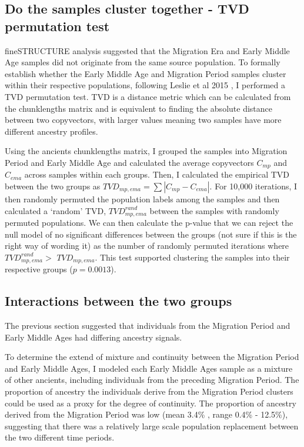 \subsection{Do the samples cluster together - TVD permutation test}

fineSTRUCTURE analysis suggested that the Migration Era and Early Middle Age samples did not originate from the same source population. To formally establish whether the Early Middle Age and Migration Period samples cluster within their respective populations, following Leslie et al 2015 \cite{Leslie2015}, I performed a TVD permutation test. TVD is a distance metric which can be calculated from the chunklengths matrix and is equivalent to finding the absolute distance between two copyvectors, with larger values meaning two samples have more different ancestry profiles.

Using the ancients chunklengths matrix, I grouped the samples into Migration Period and Early Middle Age and  calculated the average copyvectors $C_{mp}$ and $C_{ema}$ across samples within each groups. Then, I calculated the empirical TVD between the two groups as $TVD_{mp,ema} = \sum |C_{mp} - C_{ema}|$. For 10,000 iterations, I then randomly permuted the population labels among the samples and then calculated a `random' TVD, $TVD_{mp,ema}^{rand}$ between the samples with randomly permuted populations. We can then calculate the p-value that we can reject the null model of no significant differences between the groups (not sure if this is the right way of wording it) as the number of randomly permuted iterations where $TVD_{mp,ema}^{rand} > $ $TVD_{mp,ema}$. This test supported clustering the samples into their respective groups ($p=0.0013$).

\subsection{Interactions between the two groups}

The previous section suggested that individuals from the Migration Period and Early Middle Ages had differing ancestry signals. 

To determine the extend of mixture and continuity between the Migration Period and Early Middle Ages, I modeled each Early Middle Ages sample as a mixture of other ancients, including individuals from the preceding Migration Period. The proportion of ancestry the individuals derive from the Migration Period clusters could be used as a proxy for the degree of continuity. The proportion of ancestry derived from the Migration Period was low (mean 3.4\% , range 0.4\% - 12.5\%), suggesting that there was a relatively large scale population replacement between the two different time periods. 

